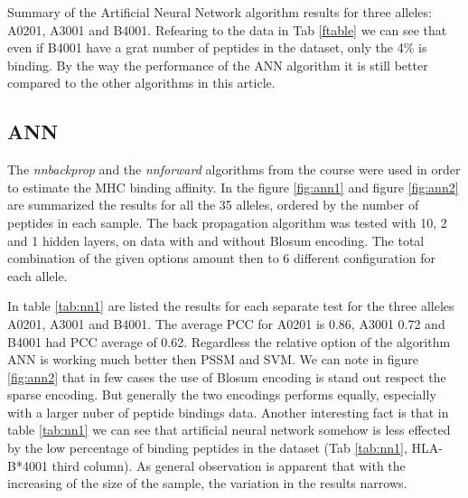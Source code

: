 \begin{table*}[hb]
\caption{Summary of the Artificial Neural Network algorithm results for three alleles: A0201, A3001 and B4001. Refearing to the data in Tab \ref{ftable} we can see that even if B4001 have a grat number of peptides in the dataset, only the 4\% is binding. By the way the performance of the ANN algorithm it is still better compared to the other algorithms in this article.}\label{tab:nn1}

\end{table*}

\subsection*{ANN}



The \textit{nnbackprop} and the \textit{nnforward} algorithms from the course were used in order to estimate the MHC binding affinity.
In the figure \ref{fig:ann1} and figure \ref{fig:ann2} are summarized the results for all the 35 alleles, ordered by the number of peptides in each sample.
The back propagation algorithm was tested with 10, 2 and 1 hidden layers, on data with and without Blosum encoding. The total combination of the given options amount then to 6 different configuration for each allele.

In table \ref{tab:nn1} are listed the results for each separate test for the three alleles A0201, A3001 and B4001.
The average PCC for A0201 is 0.86, A3001 0.72 and B4001 had PCC average of 0.62.
Regardless the relative option of the algorithm ANN is working much better then PSSM and SVM. We can note in figure \ref{fig:ann2} that in few cases the use of Blosum encoding is stand out respect the sparse encoding. But generally the two encodings performs equally, especially with a larger nuber of peptide bindings data.
Another interesting fact is that in table \ref{tab:nn1} we can see that artificial neural network somehow is less effected by the low percentage of binding peptides in the dataset (Tab \ref{tab:nn1}, HLA-B*4001 third column).
As general observation is apparent that with the increasing of the size of the sample, the variation in the results narrows. 





